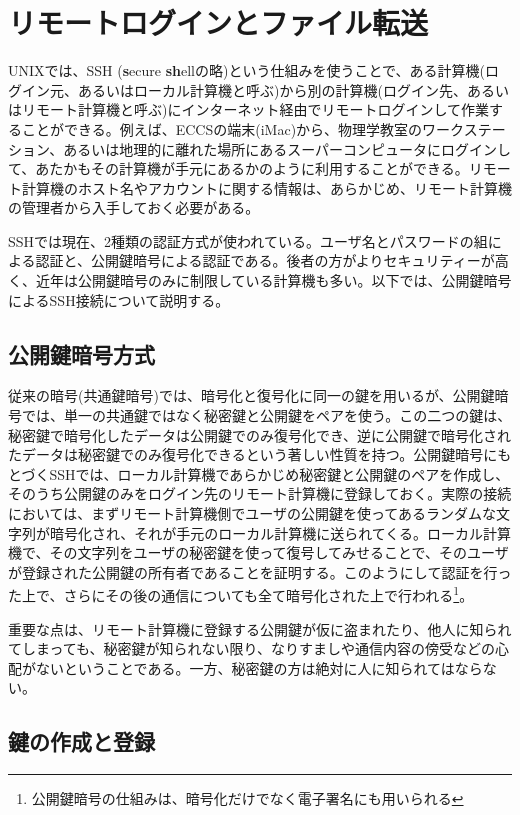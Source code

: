 \section{リモートログインとファイル転送}
\label{sec:ssh}

UNIXでは、SSH (\textbf{s}ecure \textbf{sh}ellの略)という仕組みを使うことで、ある計算機(ログイン元、あるいはローカル計算機と呼ぶ)から別の計算機(ログイン先、あるいはリモート計算機と呼ぶ)にインターネット経由でリモートログインして作業することができる。例えば、ECCSの端末(iMac)から、物理学教室のワークステーション、あるいは地理的に離れた場所にあるスーパーコンピュータにログインして、あたかもその計算機が手元にあるかのように利用することができる。リモート計算機のホスト名やアカウントに関する情報は、あらかじめ、リモート計算機の管理者から入手しておく必要がある。

SSHでは現在、2種類の認証方式が使われている。ユーザ名とパスワードの組による認証と、公開鍵暗号による認証である。後者の方がよりセキュリティーが高く、近年は公開鍵暗号のみに制限している計算機も多い。以下では、公開鍵暗号によるSSH接続について説明する。

\subsection{公開鍵暗号方式}

従来の暗号(共通鍵暗号)では、暗号化と復号化に同一の鍵を用いるが、公開鍵暗号では、単一の共通鍵ではなく秘密鍵と公開鍵をペアを使う。この二つの鍵は、秘密鍵で暗号化したデータは公開鍵でのみ復号化でき、逆に公開鍵で暗号化されたデータは秘密鍵でのみ復号化できるという著しい性質を持つ。公開鍵暗号にもとづくSSHでは、ローカル計算機であらかじめ秘密鍵と公開鍵のペアを作成し、そのうち公開鍵のみをログイン先のリモート計算機に登録しておく。実際の接続においては、まずリモート計算機側でユーザの公開鍵を使ってあるランダムな文字列が暗号化され、それが手元のローカル計算機に送られてくる。ローカル計算機で、その文字列をユーザの秘密鍵を使って復号してみせることで、そのユーザが登録された公開鍵の所有者であることを証明する。このようにして認証を行った上で、さらにその後の通信についても全て暗号化された上で行われる\footnote{公開鍵暗号の仕組みは、暗号化だけでなく電子署名にも用いられる}。

重要な点は、リモート計算機に登録する公開鍵が仮に盗まれたり、他人に知られてしまっても、秘密鍵が知られない限り、なりすましや通信内容の傍受などの心配がないということである。一方、秘密鍵の方は絶対に人に知られてはならない。

\subsection{鍵の作成と登録}

